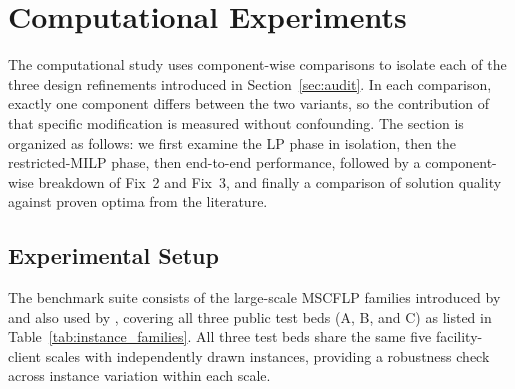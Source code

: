 \section{Computational Experiments}
\label{sec:experiments}

The computational study uses component-wise comparisons to isolate each of the
three design refinements introduced in Section~\ref{sec:audit}.
In each comparison, exactly one component differs between the two variants,
so the contribution of that specific modification is measured without confounding.
The section is organized as follows: we first examine the LP phase in isolation,
then the restricted-MILP phase, then end-to-end performance, followed by a
component-wise breakdown of Fix~2 and Fix~3, and finally a comparison of
solution quality against proven optima from the literature.

\subsection{Experimental Setup}

The benchmark suite consists of the large-scale MSCFLP families introduced by
\citet{avella2008effective} and also used by \citet{guastaroba2012kernel},
covering all three public test beds (A, B, and C) as listed in
Table~\ref{tab:instance_families}.
All three test beds share the same five facility-client scales with independently
drawn instances, providing a robustness check across instance variation
within each scale.

